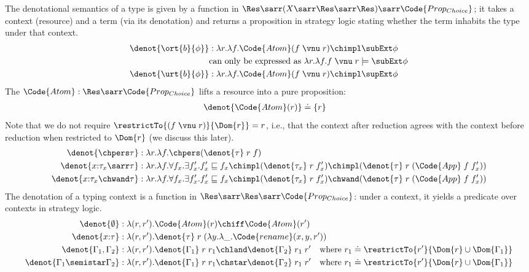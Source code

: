 The denotational semantics of a type is given by a function in $\Res \sarr (X \sarr \Res \sarr \Res) \sarr \Code{Prop_{Choice}}$; it takes a context (resource) and a term (via its denotation) and returns a proposition in strategy logic stating whether the term inhabits the type under that context.
\begin{align*}
  \denot{\ort{b}{\phi}} &: \lambda r.\lambda f. \Code{Atom}(f\;\vnu\;r) \chimpl \subExt\phi
  \\&\text{can only be expressed as } \lambda r.\lambda f. f\;\vnu\;r \models \subExt\phi
  \\\denot{\urt{b}{\phi}} &: \lambda r.\lambda f. \Code{Atom}(f\;\vnu\;r) \chimpl \supExt\phi
\end{align*}\noindent
The $\Code{Atom}: \Res \sarr \Code{Prop_{Choice}}$ lifts a resource into a pure proposition:
\begin{align*}
  \denot{\Code{Atom}(r)} &\doteq \{ r \}
\end{align*}\noindent
Note that we do not require $\restrictTo{(f\;\vnu\;r)}{\Dom{r}} = r$, i.e., that the context after reduction agrees with the context before reduction when restricted to $\Dom{r}$ (we discuss this later).
\begin{align*}
  \denot{\chpers \tau} &: \lambda r.\lambda f. \chpers (\denot{\tau}\;r\;f)
  \\\denot{x{:}\tau_x \sarr \tau} &: \lambda r.\lambda f. \forall f_x. \exists f_x'. f_x' \sqsubseteq f_x \chimpl (\denot{\tau_x}\;r\;f_x') \chimpl (\denot{\tau}\;r\;(\Code{App}\;f\;f_x'))
  \\\denot{x{:}\tau_x \chwand \tau} &: \lambda r.\lambda f. \forall f_x.\exists f_x'. f_x' \sqsubseteq f_x \chimpl (\denot{\tau_x}\;r\;f_x') \chwand (\denot{\tau}\;r\;(\Code{App}\;f\;f_x'))
\end{align*}\noindent
The denotation of a typing context is a function in $\Res \sarr \Res \sarr \Code{Prop_{Choice}}$: under a context, it yields a predicate over contexts in strategy logic.
\begin{align*}
  \denot{\emptyset} &: \lambda (r,r'). \Code{Atom}(r) \chiff \Code{Atom}(r')
  \\\denot{x{:}\tau} &: \lambda (r,r'). \denot{\tau}\;r\;(\lambda y.\lambda \_.\Code{rename}(x, y, r'))
  \\\denot{\Gamma_1, \Gamma_2} &: \lambda (r,r'). \denot{\Gamma_1}\;r\;r_1 \chland \denot{\Gamma_2}\;r_1\;r' 
  \quad \text{where } r_1 \doteq \restrictTo{r'}{\Dom{r} \cup \Dom{\Gamma_1}}
  \\\denot{\Gamma_1 \semistar \Gamma_2} &: \lambda (r,r'). \denot{\Gamma_1}\;r\;r_1 \chstar \denot{\Gamma_2}\;r_1\;r'
  \quad \text{where } r_1 \doteq \restrictTo{r'}{\Dom{r} \cup \Dom{\Gamma_1}}
\end{align*}\noindent
